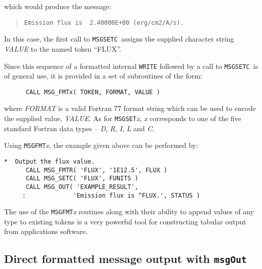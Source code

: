 \documentclass[twoside,11pt]{article}
\newcommand{\xlabel}[1]{}
\renewcommand{\_}{\texttt{\symbol{95}}}
\newcommand{\func}[1]{\texttt{#1}}
\newcommand{\farg}[1]{\textit{#1}}
\newcommand{\msgout}{\func{msgOut}}
\newcommand{\fmsgsetc}{\func{MSG\_SETC}}
\begin{document}
which would produce the message:

\begin {quote}
\begin {small}
\begin{verbatim}
Emission flux is  2.40000E+00 (erg/cm2/A/s).
\end{verbatim}
\end {small}
\end {quote}

In this case, the first call to \fmsgsetc\ assigns the supplied character 
string \farg{VALUE} to the named token ``FLUX''.

Since this sequence of a formatted internal \func{WRITE} followed by a call to
\fmsgsetc\ is of general use, it is provided in a set of subroutines of the
form:

\begin {small}
\begin{verbatim}
      CALL MSG_FMTx( TOKEN, FORMAT, VALUE )
\end{verbatim}
\end {small}

where \farg{FORMAT} is a valid Fortran 77 format string which can be used to
encode the supplied value, \farg{VALUE}.
As for \func{MSG\_SET}\textit{x}, \textit{x} corresponds to one of the five standard
Fortran data types -- \textit{D}, \textit{R}, \textit{I}, \textit{L} and \textit{C}.

Using \func{MSG\_FMT}\textit{x}, the example given above can be performed by:

\begin {small}
\begin{verbatim}
*  Output the flux value.
      CALL MSG_FMTR( 'FLUX', '1E12.5', FLUX )
      CALL MSG_SETC( 'FLUX', FUNITS )
      CALL MSG_OUT( 'EXAMPLE_RESULT', 
     :             'Emission flux is ^FLUX.', STATUS )
\end{verbatim}
\end {small}

The use of the \func{MSG\_FMT}\textit{x} routines along with their ability to append 
values of any type to existing tokens is a very powerful tool for constructing 
tabular output from applications software.

\subsection{\xlabel{direct_formatted_message_output}Direct formatted message
output with \msgout}
\end{document}
